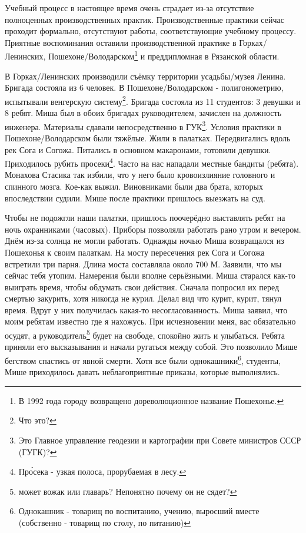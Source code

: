 Учебный процесс в настоящее время очень страдает из-за отсутствие полноценных производственных практик. Производственные практики сейчас проходит формально, отсутствуют работы, соответствующие учебному процессу. Приятные воспоминания оставили производственной практике в Горках\-/Ленинских, Пошехоне\-/Володарском\footnote{В 1992 года городу возвращено дореволюционное название Пошехонье.} и преддипломная в Рязанской области.

В Горках\-/Ленинских производили съёмку территории усадьбы\-/музея Ленина. Бригада состояла из 6 человек. В Пошехоне\-/Володарском - полигонометрию, испытывали венгерскую систему\footnote{Что это?}. Бригада состояла из 11 студентов: 3 девушки и 8 ребят. Миша был в обоих бригадах руководителем, зачислен на должность инженера. Материалы сдавали непосредственно в ГУК\footnote{Это Главное управление геодезии и картографии при Совете министров СССР (ГУГК)?}. Условия практики в Пошехоне\-/Володарском были тяжёлые. Жили в палатках. Передвигались вдоль рек Сога и Согожа. Питались в основном макаронами, готовили девушки. Приходилось рубить просеки\footnote{Пр\'{о}сека - узкая полоса, прорубаемая в лесу.}. Часто на нас нападали местные бандиты (ребята). Монахова Стасика так избили, что у него было кровоизлияние головного и спинного мозга. Кое-как выжил. Виновниками были два брата, которых впоследствии судили. Мише после практики пришлось выезжать на суд. 

Чтобы не подожгли наши палатки, пришлось поочерёдно выставлять ребят на ночь охранниками (часовых). Приборы позволяли работать рано утром и вечером. Днём из-за солнца не могли работать. Однажды ночью Миша возвращался из Пошехонья к своим палаткам. На мосту пересечения рек Сога и Согожа встретили три парня. Длина моста составляла около 700 М. Заявили, что мы сейчас тебя утопим. Намерения были вполне серьёзными. Миша старался как-то выиграть время, чтобы обдумать свои действия. Сначала попросил их перед смертью закурить, хотя никогда не курил. Делал вид что курит, курит, тянул время. Вдруг у них получилась какая-то несогласованность. Миша заявил, что моим ребятам известно где я нахожусь. При исчезновении меня, вас обязательно осудят, а руководитель\footnote{может вожак или главарь? Непонятно почему он не сядет?} будет на свободе, спокойно жить и улыбаться. Ребята приняли его высказывания и начали ругаться между собой. Это позволило Мише бегством спастись от явной смерти. Хотя все были однокашники\footnote{Однокашник - товарищ по воспитанию, учению, выросший вместе (собственно - товарищ по столу, по питанию)}, студенты, Мише приходилось давать неблагоприятные приказы, которые выполнялись.

